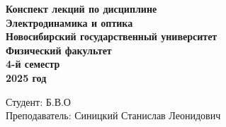 \documentclass[12pt, a4paper,oneside]{book}
\begin{document}
\begin{titlepage}
    \thispagestyle{empty}  %
    \centering
    \vspace*{1cm}  %

    \textbf{\huge Конспект лекций по дисциплине}  \\[1.5cm]  %
    \textbf{\huge Электродинамика и оптика }  \\[2cm]   %
    \textbf{\Large Новосибирский государственный университет} \\[0.5cm]
    \textbf{\large Физический факультет} \\[0.5cm]
    \textbf{\large 4-й семестр} \\[0.5cm]
    \textbf{\large 2025 год} \\[10cm]

    \begin{flushright}
        \large Студент: Б.В.О \\[0.5cm]  %
        Преподаватель: Синицкий Станислав Леонидович  %
    \end{flushright}
\end{titlepage}

\tableofcontents  %

\def\mainfile{}  %



\end{document}
